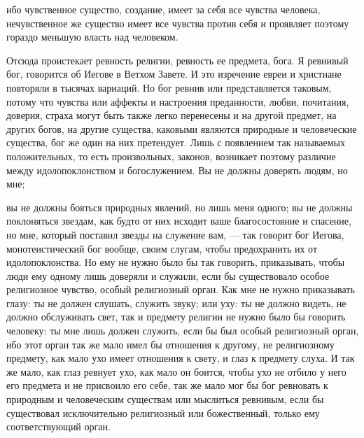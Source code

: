\documentclass[12pt]{article}
\begin{document}
ибо чувственное существо, создание, имеет за себя все чувства человека, нечувственное же существо имеет все чувства против себя и проявляет поэтому гораздо меньшую власть над человеком. 

Отсюда проистекает ревность религии, ревность ее предмета, бога. Я ревнивый бог, говорится об Иегове в Ветхом Завете. И это изречение евреи и христиане повторяли в тысячах вариаций. Но бог ревнив или представляется таковым, потому что чувства или аффекты и настроения преданности, любви, почитания, доверия, страха могут быть также легко перенесены и на другой предмет, на других богов, на другие существа, каковыми являются природные и человеческие существа, бог же один на них претендует. Лишь с появлением так называемых положительных, то есть произвольных, законов, возникает поэтому различие между идолопоклонством и богослужением. Вы не должны доверять людям, но мне; 

вы не должны бояться природных явлений, но лишь меня одного; вы не должны поклоняться звездам, как будто от них исходит ваше благосостояние и спасение, но мне, который поставил звезды на служение вам, --- так говорит бог Иегова, монотеистический бог вообще, своим слугам, чтобы предохранить их от идолопоклонства. Но ему не нужно было бы так говорить, приказывать, чтобы люди ему одному лишь доверяли и служили, если бы существовало особое религиозное чувство, особый религиозный орган. Как мне не нужно приказывать глазу: ты не должен слушать, служить звуку; или уху: ты не должно видеть, не должно обслуживать свет, так и предмету религии не нужно было бы говорить человеку: ты мне лишь должен служить, если бы был особый религиозный орган, ибо этот орган так же мало имел бы отношения к другому, не религиозному предмету, как мало ухо имеет отношения к свету, и глаз к предмету слуха. И так же мало, как глаз ревнует ухо, как мало он боится, чтобы ухо не отбило у него его предмета и не присвоило его себе, так же мало мог бы бог ревновать к природным и человеческим существам или мыслиться ревнивым, если бы существовал исключительно религиозный или божественный, только ему соответствующий орган. 
\end{document}
